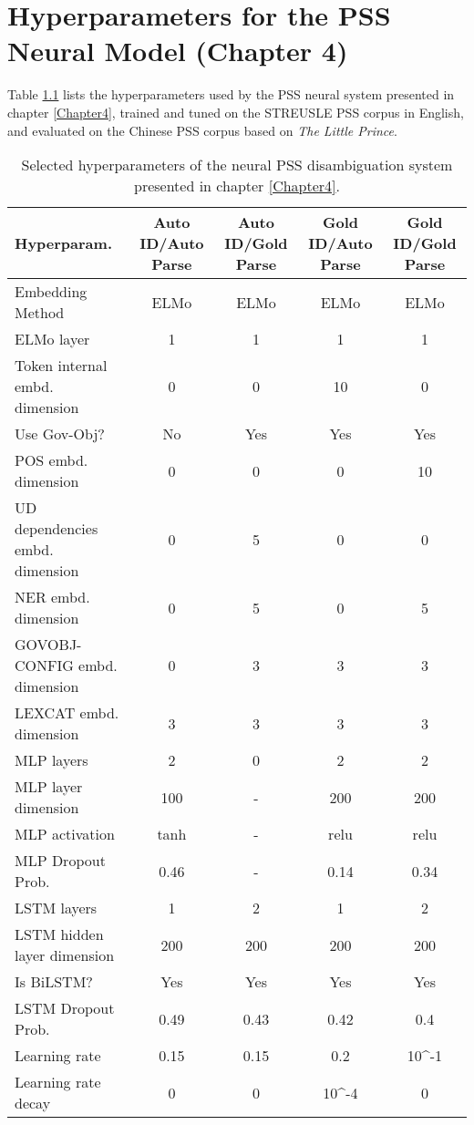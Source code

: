 
\chapter{Hyperparameters for the PSS Neural Model (Chapter 4)} %

\label{AppendixC} %

Table \ref{tab:hyperparamsC} lists the hyperparameters used by the
PSS neural system presented in chapter \ref{Chapter4}, trained and tuned on the STREUSLE PSS corpus in English, and evaluated on the Chinese PSS corpus based on \textit{The Little Prince}.

\begin{table}[]
  \small
	\centering
	\begin{tabular}{@{}l|cccc@{}}
		\toprule
		Hyperparam. & Auto ID/Auto Parse & Auto ID/Gold Parse & Gold ID/Auto Parse & Gold ID/Gold Parse\\
		\midrule
        Embedding Method & ELMo & ELMo & ELMo & ELMo \\
        ELMo layer & 1 & 1 & 1 & 1 \\
        Token internal embd. dimension & 0 & 0 & 10 & 0 \\
        Use Gov-Obj? & No & Yes & Yes & Yes \\
        POS embd. dimension  & 0 & 0 & 0 & 10 \\
        UD dependencies embd. dimension  & 0 & 5 & 0 & 0 \\
        NER  embd. dimension  & 0 & 5 & 0 & 5 \\
        GOVOBJ-CONFIG embd. dimension  & 0 & 3 & 3 & 3 \\
        LEXCAT embd. dimension  & 3 & 3 & 3 & 3 \\
        MLP layers  & 2 & 0 & 2 & 2 \\
        MLP layer dimension  & 100 & - & 200 & 200 \\
        MLP activation  & tanh & - & relu & relu \\
        MLP Dropout Prob.  & 0.46 & - & 0.14 & 0.34 \\
        LSTM layers  & 1 & 2 & 1 & 2 \\
        LSTM hidden layer dimension  & 200 & 200 & 200 & 200 \\
        Is BiLSTM? & Yes & Yes & Yes & Yes \\
        LSTM Dropout Prob.  & 0.49 & 0.43 & 0.42 & 0.4 \\
        Learning rate  & 0.15 & 0.15 & 0.2 & 10^{-1} \\
        Learning rate decay  & 0 & 0 & 10^{-4} & 0 \\
		\bottomrule
	\end{tabular}
	\caption{\label{tab:hyperparamsC}
        Selected hyperparameters of the neural PSS disambiguation system presented in chapter \ref{Chapter4}.
	}

\end{table}

